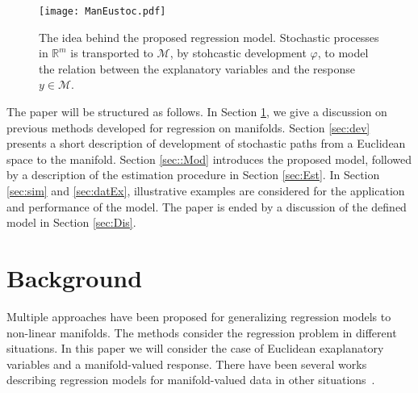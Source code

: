 \documentclass[runningheads,a4paper]{llncs}
\newcommand{\R}{\mathbb R}
\newcommand{\M}{\mathcal{M}}
\begin{document}
\begin{figure}
\centering
\texttt{[image: ManEustoc.pdf]}
\caption{The idea behind the proposed regression model. Stochastic processes in $\R^m$ is transported to $\M$, by stohcastic development $\varphi$, to model the relation between the explanatory variables and the response $y\in\M$.}
\label{fig:model}
\end{figure}

The paper will be structured as follows. In Section \ref{sec:Background}, we give a discussion on previous methods developed for regression on manifolds. Section \ref{sec:dev} presents a short description of development of stochastic paths from a Euclidean space to the manifold. Section \ref{sec::Mod} introduces the proposed model, followed by a description of the estimation procedure in Section \ref{sec:Est}. In Section \ref{sec:sim} and \ref{sec:datEx}, illustrative examples are considered for the application and performance of the model. The paper is ended by a discussion of the defined model in Section \ref{sec:Dis}.

\section{Background}
\label{sec:Background}

Multiple approaches have been proposed for generalizing regression models to non-linear manifolds. The methods consider the regression problem in different situations. In this paper we will consider the case of Euclidean exaplanatory variables and a manifold-valued response. There have been several works describing regression models for manifold-valued data in other situations~\cite{cheng_local_2013,aswani_regression_2011,loubes_kernel-based_2009,steinke_non-parametric_2009}.

\end{document}
